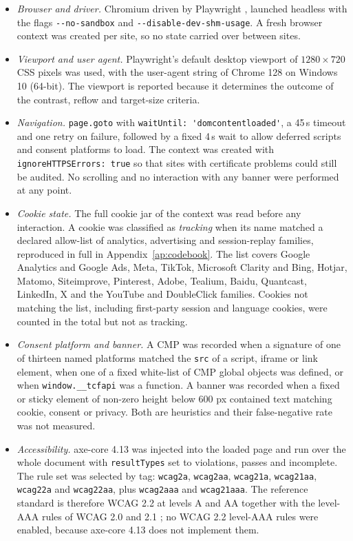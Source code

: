 \documentclass[pdflatex,sn-basic,Numbered,iicol]{sn-jnl}
\theoremstyle{thmstyleone}
\theoremstyle{thmstyletwo}
\theoremstyle{thmstylethree}
\begin{document}
	\begin{itemize}
		\item \emph{Browser and driver.} Chromium driven by Playwright \citep{playwright2026}, launched headless with the flags \verb|--no-sandbox| and \verb|--disable-dev-shm-usage|. A fresh browser context was created per site, so no state carried over between sites.
		\item \emph{Viewport and user agent.} Playwright's default desktop viewport of $1280 \times 720$ CSS pixels was used, with the user-agent string of Chrome 128 on Windows 10 (64-bit). The viewport is reported because it determines the outcome of the contrast, reflow and target-size criteria.
		\item \emph{Navigation.} \verb|page.goto| with \verb|waitUntil: 'domcontentloaded'|, a 45\,s timeout and one retry on failure, followed by a fixed 4\,s wait to allow deferred scripts and consent platforms to load. The context was created with \verb|ignoreHTTPSErrors: true| so that sites with certificate problems could still be audited. No scrolling and no interaction with any banner were performed at any point.
		\item \emph{Cookie state.} The full cookie jar of the context was read before any interaction. A cookie was classified as \emph{tracking} when its name matched a declared allow-list of analytics, advertising and session-replay families, reproduced in full in Appendix~\ref{ap:codebook}. The list covers Google Analytics and Google Ads, Meta, TikTok, Microsoft Clarity and Bing, Hotjar, Matomo, Siteimprove, Pinterest, Adobe, Tealium, Baidu, Quantcast, LinkedIn, X and the YouTube and DoubleClick families. Cookies not matching the list, including first-party session and language cookies, were counted in the total but not as tracking.
		\item \emph{Consent platform and banner.} A CMP was recorded when a signature of one of thirteen named platforms matched the \verb|src| of a script, iframe or link element, when one of a fixed white-list of CMP global objects was defined, or when \verb|window.__tcfapi| was a function. A banner was recorded when a fixed or sticky element of non-zero height below 600 px contained text matching cookie, consent or privacy. Both are heuristics and their false-negative rate was not measured.
		\item \emph{Accessibility.} axe-core 4.13 \citep{axecore2026} was injected into the loaded page and run over the whole document with \verb|resultTypes| set to violations, passes and incomplete. The rule set was selected by tag: \verb|wcag2a|, \verb|wcag2aa|, \verb|wcag21a|, \verb|wcag21aa|, \verb|wcag22a| and \verb|wcag22aa|, plus \verb|wcag2aaa| and \verb|wcag21aaa|. The reference standard is therefore WCAG 2.2 at levels A and AA \citep{wcag22} together with the level-AAA rules of WCAG 2.0 and 2.1 \citep{wcag20,wcag21}; no WCAG 2.2 level-AAA rules were enabled, because axe-core 4.13 does not implement them.

\end{itemize}
\end{document}
